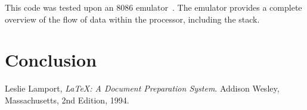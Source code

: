 \documentclass[12pt,a4paper]{article}
\begin{document}
This code was tested upon an 8086 emulator~\cite{emu8086}.
The emulator provides a complete overview of the flow of data within the processor, including the stack. 


\section{Conclusion}






\renewcommand{\refname}{Bibliography}
\begin{thebibliography}{9}

  Leslie Lamport,
  \emph{\LaTeX: A Document Preparation System}.
  Addison Wesley, Massachusetts,
  2nd Edition,
  1994.

\end{thebibliography}
\end{document}
